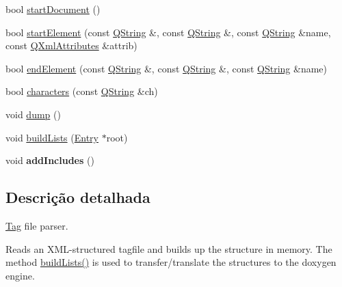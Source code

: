 \begin{DoxyCompactItemize}
\item 
bool \hyperlink{class_tag_file_parser_af5342502614ae37eaa64a8d3e404027d}{start\-Document} ()
\item 
bool \hyperlink{class_tag_file_parser_a3ebad496b56e71d502ae20cafd62d524}{start\-Element} (const \hyperlink{class_q_string}{Q\-String} \&, const \hyperlink{class_q_string}{Q\-String} \&, const \hyperlink{class_q_string}{Q\-String} \&name, const \hyperlink{class_q_xml_attributes}{Q\-Xml\-Attributes} \&attrib)
\item 
bool \hyperlink{class_tag_file_parser_abd7a2eb8d83ec76ec743ddd66a11d2af}{end\-Element} (const \hyperlink{class_q_string}{Q\-String} \&, const \hyperlink{class_q_string}{Q\-String} \&, const \hyperlink{class_q_string}{Q\-String} \&name)
\item 
bool \hyperlink{class_tag_file_parser_a6eb7b9d9a6138bf566cc61ae9b5e436a}{characters} (const \hyperlink{class_q_string}{Q\-String} \&ch)
\item 
void \hyperlink{class_tag_file_parser_accd2600060dbaee3a3b41aed4034c63c}{dump} ()
\item 
void \hyperlink{class_tag_file_parser_a812ab99e31bb6102ca3d40e4fc648d65}{build\-Lists} (\hyperlink{class_entry}{Entry} $\ast$root)
\item 
\hypertarget{class_tag_file_parser_a20f464de68a733f17bf228316c12b95e}{void {\bfseries add\-Includes} ()}\label{class_tag_file_parser_a20f464de68a733f17bf228316c12b95e}

\end{DoxyCompactItemize}


\subsection{Descrição detalhada}
\hyperlink{class_tag}{Tag} file parser.

Reads an X\-M\-L-\/structured tagfile and builds up the structure in memory. The method \hyperlink{class_tag_file_parser_a812ab99e31bb6102ca3d40e4fc648d65}{build\-Lists()} is used to transfer/translate the structures to the doxygen engine. 

